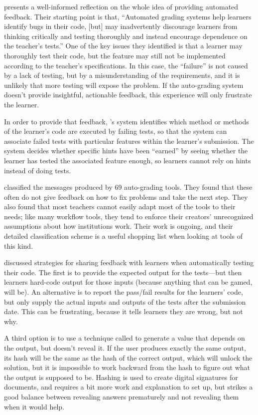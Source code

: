 \cite{Buff2015} presents a well-informed reflection on
the whole idea of providing automated feedback. Their starting point
is that, ``Automated grading systems help learners identify bugs in
their code, {[}but{]} may inadvertently discourage learners from thinking
critically and testing thoroughly and instead encourage dependence on
the teacher's tests.'' One of the key issues they identified is that a
learner may thoroughly test their code, but the feature may still not
be implemented according to the teacher's specifications. In this
case, the ``failure'' is not caused by a lack of testing, but by a
misunderstanding of the requirements, and it is unlikely that more
testing will expose the problem. If the auto-grading system doesn't
provide insightful, actionable feedback, this experience will only
frustrate the learner.

In order to provide that feedback, \cite{Buff2015}'s system
identifies which method or methods of the learner's code are executed by
failing tests, so that the system can associate failed tests with
particular features within the learner's submission. The system decides
whether specific hints have been ``earned'' by seeing whether the learner
has tested the associated feature enough, so learners cannot rely on
hints instead of doing tests.

\cite{Keun2016a,Keun2016b} classified the messages produced by 69
auto-grading tools. They found that these often do not give feedback on
how to fix problems and take the next step. They also found that most
teachers cannot easily adapt most of the tools to their needs; like many
workflow tools, they tend to enforce their creators' unrecognized
assumptions about how institutions work. Their work is ongoing, and
their detailed classification scheme is a useful shopping list when
looking at tools of this kind.

\cite{Srid2016} discussed strategies for sharing feedback with
learners when automatically testing their code. The first is to provide
the expected output for the tests---but then learners hard-code output for
those inputs (because anything that can be gamed, will be). An
alternative is to report the pass/fail results for the learners' code,
but only supply the actual inputs and outputs of the tests after the
submission date. This can be frustrating, because it tells learners they
are wrong, but not why.

A third option is to use a technique called  to
generate a value that depends on the output, but doesn't reveal it. If
the user produces exactly the same output, its hash will be the same
as the hash of the correct output, which will unlock the solution, but
it is impossible to work backward from the hash to figure out what the
output is supposed to be. Hashing is used to create digital signatures
for documents, and requires a bit more work and explanation to set up,
but strikes a good balance between revealing answers prematurely and
not revealing them when it would help.

